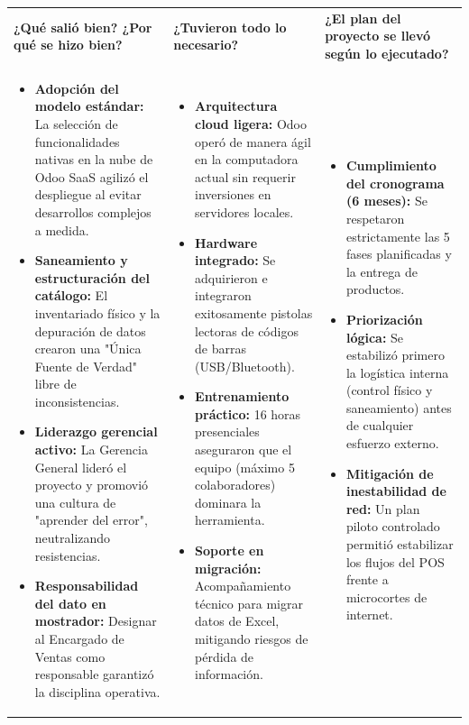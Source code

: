 \documentclass[11pt]{article}
\begin{document}
\begin{longtable}{|p{5.1cm}|p{5.1cm}|p{5.1cm}|}
\hline
\rowcolor{RoundGray}\multicolumn{3}{|l|}{\textbf{Primera Ronda}} \\ \hline
\rowcolor{HeaderGray}\textbf{¿Qué salió bien? ¿Por qué se hizo bien?} & \textbf{¿Tuvieron todo lo necesario?} & \textbf{¿El plan del proyecto se llevó según lo ejecutado?} \\ \hline
\begin{itemize}[leftmargin=*,nosep]
    \item \textbf{Adopción del modelo estándar:} La selección de funcionalidades nativas en la nube de Odoo SaaS agilizó el despliegue al evitar desarrollos complejos a medida.
    \item \textbf{Saneamiento y estructuración del catálogo:} El inventariado físico y la depuración de datos crearon una "Única Fuente de Verdad" libre de inconsistencias.
    \item \textbf{Liderazgo gerencial activo:} La Gerencia General lideró el proyecto y promovió una cultura de "aprender del error", neutralizando resistencias.
    \item \textbf{Responsabilidad del dato en mostrador:} Designar al Encargado de Ventas como responsable garantizó la disciplina operativa.
\end{itemize} &
\begin{itemize}[leftmargin=*,nosep]
    \item \textbf{Arquitectura cloud ligera:} Odoo operó de manera ágil en la computadora actual sin requerir inversiones en servidores locales.
    \item \textbf{Hardware integrado:} Se adquirieron e integraron exitosamente pistolas lectoras de códigos de barras (USB/Bluetooth).
    \item \textbf{Entrenamiento práctico:} 16 horas presenciales aseguraron que el equipo (máximo 5 colaboradores) dominara la herramienta.
    \item \textbf{Soporte en migración:} Acompañamiento técnico para migrar datos de Excel, mitigando riesgos de pérdida de información.
\end{itemize} &
\begin{itemize}[leftmargin=*,nosep]
    \item \textbf{Cumplimiento del cronograma (6 meses):} Se respetaron estrictamente las 5 fases planificadas y la entrega de productos.
    \item \textbf{Priorización lógica:} Se estabilizó primero la logística interna (control físico y saneamiento) antes de cualquier esfuerzo externo.
    \item \textbf{Mitigación de inestabilidad de red:} Un plan piloto controlado permitió estabilizar los flujos del POS frente a microcortes de internet.
\end{itemize} \\ \hline
\end{longtable}
\end{document}
